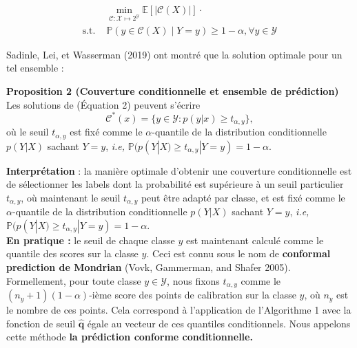\documentclass[12pt,a4paper]{article}
\begin{document}
\begin{equation}
\begin{aligned}
& \min_{\mathcal{C}: \mathcal{X} \mapsto 2^{\mathcal{Y}}} \mathbb{E}[|\mathcal{C}(X)|] \cdot \\
\text{s.t. } & \mathbb{P} (y \in \mathcal{C}(X) \mid Y = y) \ge 1 - \alpha, \forall y \in \mathcal{Y}
\end{aligned}
\end{equation}

\noindent Sadinle, Lei, et Wasserman ({\color{linkorange}2019}) ont montré que la solution optimale pour un tel ensemble :\\

\begin{tcolorbox}[
     enhanced,
    colback=propbg,
    colframe=propbg,
    boxrule=0pt,
    leftrule=4pt,
    borderline west={4pt}{0pt}{propborder},
    arc=2pt,
    left=2mm, right=2mm, top=2mm, bottom=2mm
]
\textbf{Proposition 2 (Couverture conditionnelle et ensemble de prédiction)} Les solutions de ({\color{linkorange}Équation 2}) peuvent s'écrire
\[
\mathcal{C}^*(x) = \{y \in \mathcal{Y} : p(y|x) \ge t_{\alpha,y}\},
\]
où le seuil $t_{\alpha,y}$ est fixé comme le $\alpha$-quantile de la distribution conditionnelle $p(Y|X)$ sachant $Y = y$, \textit{i.e,} $\mathbb{P}(p(Y|X) \ge t_{\alpha,y} | Y = y) = 1 - \alpha$.
\end{tcolorbox}


\noindent 
\textbf{Interprétation} : la manière optimale d'obtenir une couverture conditionnelle est de sélectionner les labels dont la probabilité est supérieure à un seuil particulier $t_{\alpha,y}$, où maintenant le seuil $t_{\alpha,y}$ peut être adapté par classe, et est fixé comme le $\alpha$-quantile de la distribution conditionnelle $p(Y|X)$ sachant $Y = y$, \textit{i.e,} $\mathbb{P}(p(Y|X) \ge t_{\alpha,y} | Y = y) = 1 - \alpha$.\\

\noindent \textbf{En pratique :} le seuil de chaque classe $y$ est maintenant calculé comme le quantile des scores sur la classe $y$. Ceci est connu sous le nom de \textbf{conformal prediction de Mondrian} ({\color{citeorange}Vovk, Gammerman, and Shafer 2005}). Formellement, pour toute classe $y \in \mathcal{Y}$, nous fixons $t_{\alpha,y}$ comme le $(n_y + 1)(1 - \alpha)$-ième score des points de calibration sur la classe $y$, où $n_y$ est le nombre de ces points. Cela correspond à l'application de l'{\color{citeorange}Algorithme 1} avec la fonction de seuil $\mathbf{\hat{q}}$ égale au vecteur de ces quantiles conditionnels. Nous appelons cette méthode \textbf{la prédiction conforme conditionnelle.}\\
\end{document}
